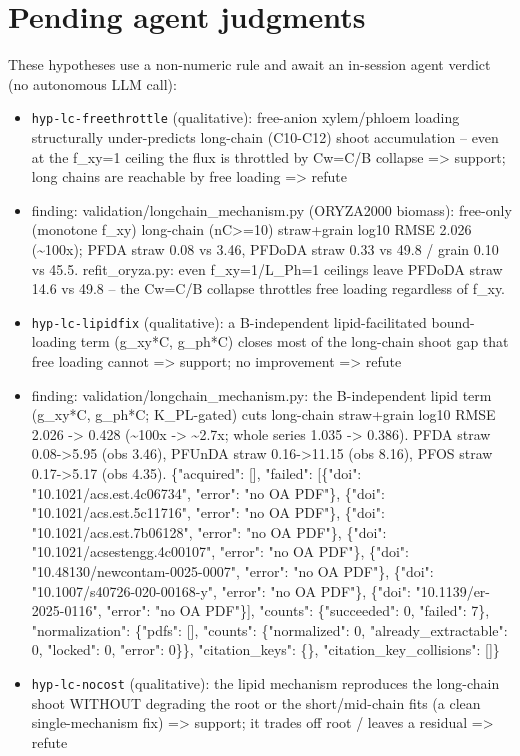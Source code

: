 \documentclass{article}
\begin{document}
\section{Pending agent judgments}
These hypotheses use a non-numeric rule and await an in-session agent verdict (no autonomous LLM call):
\begin{itemize}
  \item \texttt{hyp-lc-freethrottle} (qualitative): free-anion xylem/phloem loading structurally under-predicts long-chain (C10-C12) shoot accumulation -- even at the f\_xy=1 ceiling the flux is throttled by Cw=C/B collapse => support; long chains are reachable by free loading => refute
  \item finding: validation/longchain\_mechanism.py (ORYZA2000 biomass): free-only (monotone f\_xy) long-chain (nC>=10) straw+grain log10 RMSE 2.026 (\textasciitilde{}100x); PFDA straw 0.08 vs 3.46, PFDoDA straw 0.33 vs 49.8 / grain 0.10 vs 45.5. refit\_oryza.py: even f\_xy=1/L\_Ph=1 ceilings leave PFDoDA straw 14.6 vs 49.8 -- the Cw=C/B collapse throttles free loading regardless of f\_xy.
  \item \texttt{hyp-lc-lipidfix} (qualitative): a B-independent lipid-facilitated bound-loading term (g\_xy*C, g\_ph*C) closes most of the long-chain shoot gap that free loading cannot => support; no improvement => refute
  \item finding: validation/longchain\_mechanism.py: the B-independent lipid term (g\_xy*C, g\_ph*C; K\_PL-gated) cuts long-chain straw+grain log10 RMSE 2.026 -> 0.428 (\textasciitilde{}100x -> \textasciitilde{}2.7x; whole series 1.035 -> 0.386). PFDA straw 0.08->5.95 (obs 3.46), PFUnDA straw 0.16->11.15 (obs 8.16), PFOS straw 0.17->5.17 (obs 4.35).
\{"acquired": [], "failed": [\{"doi": "10.1021/acs.est.4c06734", "error": "no OA PDF"\}, \{"doi": "10.1021/acs.est.5c11716", "error": "no OA PDF"\}, \{"doi": "10.1021/acs.est.7b06128", "error": "no OA PDF"\}, \{"doi": "10.1021/acsestengg.4c00107", "error": "no OA PDF"\}, \{"doi": "10.48130/newcontam-0025-0007", "error": "no OA PDF"\}, \{"doi": "10.1007/s40726-020-00168-y", "error": "no OA PDF"\}, \{"doi": "10.1139/er-2025-0116", "error": "no OA PDF"\}], "counts": \{"succeeded": 0, "failed": 7\}, "normalization": \{"pdfs": [], "counts": \{"normalized": 0, "already\_extractable": 0, "locked": 0, "error": 0\}\}, "citation\_keys": \{\}, "citation\_key\_collisions": []\}
  \item \texttt{hyp-lc-nocost} (qualitative): the lipid mechanism reproduces the long-chain shoot WITHOUT degrading the root or the short/mid-chain fits (a clean single-mechanism fix) => support; it trades off root / leaves a residual => refute

\end{itemize}
\end{document}
